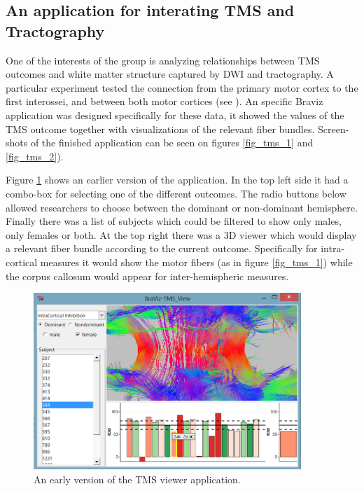 

 


\subsection{An application for interating TMS and Tractography}

One of the interests of the group is analyzing relationships between TMS outcomes and white matter structure captured by DWI and tractography. A particular experiment tested the connection from the primary motor cortex to the first interossei, and between both motor cortices (see \autocite{schneider_cerebral_2012}). An specific Braviz application was designed specifically for these data, it showed the values of the TMS outcome together with visualizations of the relevant fiber bundles. Screen-shots of the finished application can be seen on figures \ref{fig_tms_1} and \ref{fig_tms_2}). 

Figure \ref{fig_tms_view_early} shows an earlier version of the application. In the top left side it had a combo-box for selecting one of the different outcomes. The radio buttons below allowed researchers to choose between the dominant or non-dominant hemisphere. Finally there was a list of subjects which could be filtered to show only males, only females or both. At the top right there was a 3D viewer which would display a relevant fiber bundle according to the current outcome. Specifically for intra-cortical measures it would show the motor fibers (as in figure \ref{fig_tms_1}) while the corpus callosum would appear for inter-hemispheric measures.

\begin{figure}
	\centering
		\includegraphics[width=0.90\textwidth]{figures/analysis/tms_view_early}
	\caption{An early version of the TMS viewer application.}
	\label{fig_tms_view_early}
\end{figure}


